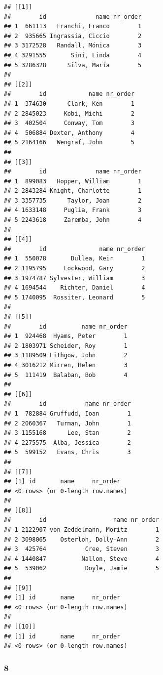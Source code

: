 \documentclass[]{article}
\begin{document}
\begin{verbatim}
## [[1]]
##        id              name nr_order
## 1  661113   Franchi, Franco        1
## 2  935665 Ingrassia, Ciccio        2
## 3 3172528   Randall, Mónica        3
## 4 3291555       Sini, Linda        4
## 5 3286328      Silva, María        5
##
## [[2]]
##        id            name nr_order
## 1  374630      Clark, Ken        1
## 2 2845023     Kobi, Michi        2
## 3  402504     Conway, Tom        3
## 4  506884 Dexter, Anthony        4
## 5 2164166   Wengraf, John        5
##
## [[3]]
##        id              name nr_order
## 1  899083   Hopper, William        1
## 2 2843284 Knight, Charlotte        1
## 3 3357735      Taylor, Joan        2
## 4 1633148     Puglia, Frank        3
## 5 2243618     Zaremba, John        4
##
## [[4]]
##        id               name nr_order
## 1  550078       Dullea, Keir        1
## 2 1195795     Lockwood, Gary        2
## 3 1974787 Sylvester, William        3
## 4 1694544    Richter, Daniel        4
## 5 1740095  Rossiter, Leonard        5
##
## [[5]]
##        id          name nr_order
## 1  924468  Hyams, Peter        1
## 2 1803971 Scheider, Roy        1
## 3 1189509 Lithgow, John        2
## 4 3016212 Mirren, Helen        3
## 5  111419  Balaban, Bob        4
##
## [[6]]
##        id           name nr_order
## 1  782884 Gruffudd, Ioan        1
## 2 2060367   Turman, John        1
## 3 1155168      Lee, Stan        2
## 4 2275575  Alba, Jessica        2
## 5  599152   Evans, Chris        3
##
## [[7]]
## [1] id       name     nr_order
## <0 rows> (or 0-length row.names)
##
## [[8]]
##        id                   name nr_order
## 1 2122907 von Zeddelmann, Moritz        1
## 2 3098065    Osterloh, Dolly-Ann        2
## 3  425764           Cree, Steven        3
## 4 1440847          Nallon, Steve        4
## 5  539062           Doyle, Jamie        5
##
## [[9]]
## [1] id       name     nr_order
## <0 rows> (or 0-length row.names)
##
## [[10]]
## [1] id       name     nr_order
## <0 rows> (or 0-length row.names)
\end{verbatim}

\subsubsection{8}\label{section}
\end{document}
